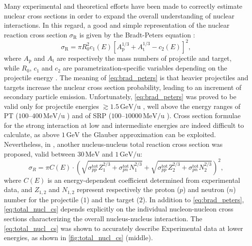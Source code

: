 Many experimental and theoretical efforts have been made to correctly estimate nuclear cross sections in order to expand the overall understanding of nuclear interactions. In this regard, a good and simple representation of the nuclear reaction cross section $\sigma_\text{R}$ is given by the Bradt-Peters equation \cite{Bradt1950}:
\begin{equation}
	\sigma_\text{R}=\pi R_0^2c_1(E)\left[A_\text{p}^{1/3}+A_\text{t}^{1/3}-c_2(E)\right]^2,
	\label{eq:brad_peters}
\end{equation}
where $A_\text{p}$ and $A_\text{t}$ are respectively the mass numbers of projectile and target, while $R_0$, $c_1$ and $c_2$ are parametrization-specific variables depending on the projectile energy \cite{PhysRevC.11.360,BARSHAY19745}. The meaning of \autoref{eq:brad_peters} is that heavier projectiles and targets increase the nuclear cross section probability, leading to an increment of secondary particle emission. Unfortunately, \autoref{eq:brad_peters} was proved to be valid only for projectile energies $\gtrsim1.5\,\mathrm{GeV/u}$ \cite{ZarrellaPhDThesis}, well above the energy ranges of PT ($100$--$400\,\mathrm{MeV/u}$ \cite{rangeVerification}) and of SRP ($100$--$\num{10000}\,\mathrm{MeV/u}$ \cite{NORBURY2012315}). Cross section formulae for the strong interaction at low and intermediate energies are indeed difficult to calculate, as above $1\,\mathrm{GeV}$ the Glauber approximation \cite{SHMAKOV1989125,PhysRevC.67.054607} can be exploited. Nevertheless, in \cite{articleAbuIbrahim}, another nucleus-nucleus total reaction cross section was proposed, valid between $30\,\mathrm{MeV}$ and $1\,\mathrm{GeV/u}$:
\begin{equation}
	\sigma_{R}=\pi C(E) \cdot \left(
	\sqrt{\sigma_{pp}^{\text{tot}} Z_1^{2/3}
	+ \sigma_{pn}^{\text{tot}} N_1^{2/3}}
	+
	\sqrt{\sigma_{pp}^{\text{tot}} Z_2^{2/3}
	+ \sigma_{pn}^{\text{tot}} N_2^{2/3}}
	\right)^2,
	\label{eq:total_nucl_cs}
\end{equation}
where $C(E)$ is an energy-dependent coefficient determined from experimental data, and $Z_{1,2}$ and $N_{1,2}$ represent respectively the proton ($p$) and neutron ($n$) number for the projectile ($1$) and the target ($2$). In addition to \autoref{eq:brad_peters}, \autoref{eq:total_nucl_cs} depends explicitly on the individual nucleon-nucleon cross sections characterizing the overall nucleus-nucleus interaction. The \autoref{eq:total_nucl_cs} was shown to accurately describe Experimental data at lower energies, as shown in \autoref{fig:total_nucl_cs} (middle).


